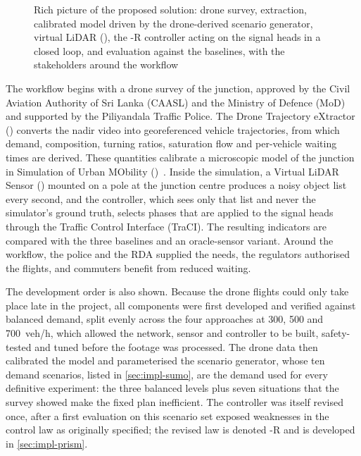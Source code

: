 \begin{figure}[htbp]
{}
  \caption{Rich picture of the proposed solution: drone survey, \dtx{} extraction, calibrated \sumo{} model driven by the drone-derived scenario generator, virtual LiDAR (\vls{}), the \prism{}-R controller acting on the signal heads in a closed loop, and evaluation against the baselines, with the stakeholders around the workflow}
  \label{fig:intro-richpicture}
\end{figure}

The workflow begins with a drone survey of the junction, approved by the Civil Aviation Authority of Sri Lanka (CAASL) and the Ministry of Defence (MoD) and supported by the Piliyandala Traffic Police. The Drone Trajectory eXtractor (\dtx{}) converts the nadir video into georeferenced vehicle trajectories, from which demand, composition, turning ratios, saturation flow and per-vehicle waiting times are derived. These quantities calibrate a microscopic model of the junction in Simulation of Urban MObility (\sumo{})~\cite{lopez2018sumo}. Inside the simulation, a Virtual LiDAR Sensor (\vls{}) mounted on a pole at the junction centre produces a noisy object list every second, and the \prism{} controller, which sees only that list and never the simulator's ground truth, selects phases that are applied to the signal heads through the Traffic Control Interface (TraCI). The resulting indicators are compared with the three baselines and an oracle-sensor variant. Around the workflow, the police and the RDA supplied the needs, the regulators authorised the flights, and commuters benefit from reduced waiting.

The development order is also shown. Because the drone flights could only take place late in the project, all components were first developed and verified against balanced demand, split evenly across the four approaches at 300, 500 and 700~veh/h, which allowed the network, sensor and controller to be built, safety-tested and tuned before the footage was processed. The drone data then calibrated the model and parameterised the scenario generator, whose ten demand scenarios, listed in \cref{sec:impl-sumo}, are the demand used for every definitive experiment: the three balanced levels plus seven situations that the survey showed make the fixed plan inefficient. The controller was itself revised once, after a first evaluation on this scenario set exposed weaknesses in the control law as originally specified; the revised law is denoted \prism{}-R and is developed in \cref{sec:impl-prism}.

